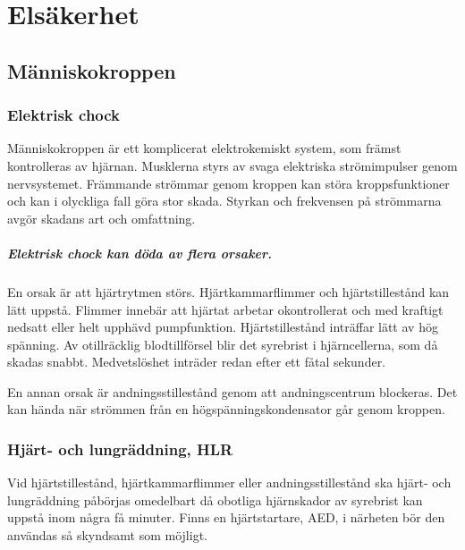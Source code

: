 \chapter{Elsäkerhet}
\label{ch:elsakerhet}

\section{Människokroppen}

\subsection{Elektrisk chock}

Människokroppen är ett komplicerat elektrokemiskt system, som främst
kontrolleras av hjärnan.
Musklerna styrs av svaga elektriska strömimpulser genom nervsystemet.
Främmande strömmar genom kroppen kan störa kroppsfunktioner och kan i olyckliga
fall göra stor skada.
Styrkan och frekvensen på strömmarna avgör skadans art och omfattning.

\paragraph{Elektrisk chock kan döda av flera orsaker.}
En orsak är att hjärtrytmen störs.
Hjärtkammarflimmer och hjärtstillestånd kan lätt uppstå.
Flimmer innebär att hjärtat arbetar okontrollerat och med kraftigt nedsatt
eller helt upphävd pumpfunktion.
Hjärtstillestånd inträffar lätt av hög spänning.
Av otillräcklig blodtillförsel blir det syrebrist i hjärncellerna, som då
skadas snabbt.
Medvetslöshet inträder redan efter ett fåtal sekunder.

En annan orsak är andningsstillestånd genom att andningscentrum blockeras.
Det kan hända när strömmen från en högspänningskondensator går genom kroppen.

\subsection{Hjärt- och lungräddning, HLR}

Vid hjärtstillestånd, hjärtkammarflimmer eller andningsstillestånd ska
hjärt- och lungräddning påbörjas omedelbart då obotliga hjärnskador av
syrebrist kan uppstå inom några få minuter.
Finns en hjärtstartare, AED, i närheten bör den användas så skyndsamt som
möjligt.

